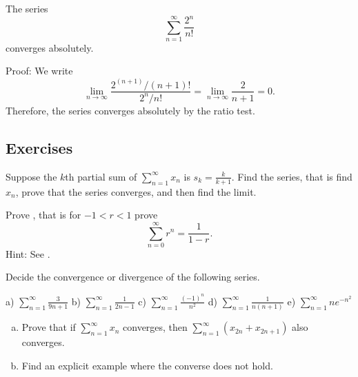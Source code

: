 \begin{example}
The series
\begin{equation*}
\sum_{n=1}^\infty \frac{2^n}{n!}
\end{equation*}
converges absolutely.

Proof:  We write
\begin{equation*}
\lim_{n\to\infty} \frac{2^{(n+1)}/(n+1)!}{2^n / n!} =
\lim_{n\to\infty} \frac{2}{n+1} = 0 .
\end{equation*}
Therefore, the series converges absolutely by the ratio test.
\end{example}

\subsection{Exercises}

\begin{exercise}
Suppose the $k$th partial sum of $\displaystyle \sum_{n=1}^\infty x_n$ is $s_k = \frac{k}{k+1}$.
Find the series, that is find $x_n$, prove that the series converges, and
then find the limit.
\end{exercise}

\begin{exercise} \label{geometric:exr}
Prove , that is for $-1 < r < 1$ prove
\begin{equation*}
\sum_{n=0}^\infty r^n = \frac{1}{1-r} .
\end{equation*}
Hint:  See .
\end{exercise}

\begin{exercise}
Decide the convergence or divergence of the following series.

\medskip

\noindent
a)
$\displaystyle \sum_{n=1}^\infty \frac{3}{9n+1}$
\qquad
b)
$\displaystyle \sum_{n=1}^\infty \frac{1}{2n-1}$
\qquad
c)
$\displaystyle \sum_{n=1}^\infty \frac{{(-1)}^n}{n^2}$
\qquad
d)
$\displaystyle \sum_{n=1}^\infty \frac{1}{n(n+1)}$
\qquad
e)
$\displaystyle \sum_{n=1}^\infty n e^{-n^2}$
\end{exercise}

\begin{samepage}
\begin{exercise}
\leavevmode
\begin{enumerate}[a)]
\item Prove that if
$\displaystyle
\sum_{n=1}^\infty x_n
$
converges, then
$\displaystyle
\sum_{n=1}^\infty ( x_{2n} + x_{2n+1} )
$
also converges.
\item
Find an explicit example where the converse does not hold.
\end{enumerate}
\end{exercise}
\end{samepage}

